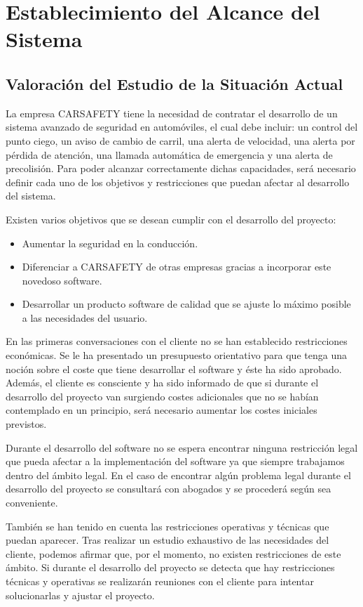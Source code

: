 

\section{Establecimiento del Alcance del Sistema}

\subsection{Valoración del Estudio de la Situación Actual}
\par La empresa CARSAFETY tiene la necesidad de contratar el desarrollo de un sistema avanzado de seguridad en automóviles, el cual debe incluir: un control del punto ciego, un aviso de cambio de carril, una alerta de velocidad, una alerta por pérdida de atención, una llamada automática de emergencia y una alerta de precolisión. Para poder alcanzar correctamente dichas capacidades, será necesario definir cada uno de los objetivos y restricciones que puedan afectar al desarrollo del sistema.
\par Existen varios objetivos que se desean cumplir con el desarrollo del proyecto:

\begin{itemize}[-]
\item Aumentar la seguridad en la conducción.
\item Diferenciar a CARSAFETY de otras empresas gracias a incorporar este novedoso software.
\item Desarrollar un producto software de calidad que se ajuste lo máximo posible a las necesidades del usuario.
\end{itemize}

\par En las primeras conversaciones con el cliente no se han establecido restricciones económicas. Se le ha presentado un presupuesto orientativo para que tenga una noción sobre el coste que tiene desarrollar el software y éste ha sido aprobado. Además, el cliente es consciente y ha sido informado de que si durante el desarrollo del proyecto van surgiendo costes adicionales que no se habían contemplado en un principio, será necesario aumentar los costes iniciales previstos.
\par Durante el desarrollo del software no se espera encontrar ninguna restricción legal que pueda afectar a la implementación del software ya que siempre trabajamos dentro del ámbito legal. En el caso de encontrar algún problema legal durante el desarrollo del proyecto se consultará con abogados y se procederá según sea conveniente.
\par También se han tenido en cuenta las restricciones operativas y técnicas que puedan aparecer. Tras realizar un estudio exhaustivo de las necesidades del cliente, podemos afirmar que, por el momento, no existen restricciones de este ámbito. Si durante el desarrollo del proyecto se detecta que hay restricciones técnicas y operativas se realizarán reuniones con el cliente para intentar solucionarlas y ajustar el proyecto.


